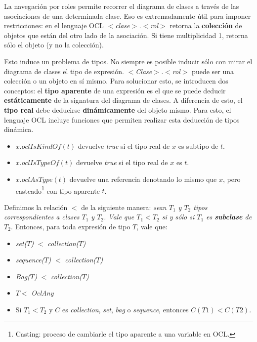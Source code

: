 \documentclass[]{article}
\begin{document}
La navegación por roles permite recorrer el diagrama de clases a través de las asociaciones de una determinada clase. Eso es extremadamente útil para imponer restricciones: en el lenguaje OCL \textit{$<$clase$>$.$<$rol$>$} retorna la \textbf{colección} de objetos que están del otro lado de la asociación. Si tiene multiplicidad 1, retorna sólo el objeto (y no la colección).

Esto induce un problema de tipos. No siempre es posible inducir sólo con mirar el diagrama de clases el tipo de expresión. \textit{$<$Clase$>$.$<$rol$>$} puede ser una colección o un objeto en sí mismo. Para solucionar esto, se introducen dos conceptos: el \textbf{tipo aparente} de una expresión es el que se puede deducir \textbf{estáticamente} de la signatura del diagrama de clases. A diferencia de esto, el \textbf{tipo real} debe deducirse \textbf{dinámicamente} del objeto mismo.  Para esto, el lenguaje OCL incluye funciones que permiten realizar esta deducción de tipos dinámica.
\begin{itemize}
	\item $x.oclIsKindOf(t)$ devuelve \textit{true} si el tipo real de $x$ es subtipo de $t$.
	\item $x.oclIsTypeOf(t)$ devuelve \textit{true} si el tipo real de $x$ es $t$.
	\item $x.oclAsType(t)$ devuelve una referencia denotando lo mismo que $x$, pero casteado\footnote{Casting: proceso de cambiarle el tipo aparente a una variable en OCL.} con tipo aparente $t$.
\end{itemize}

Definimos la relación $<$ de la siguiente manera: \textit{sean $T_1$ y $T_2$ tipos correspondientes a clases $T_1$ y $T_2$. Vale que $T_1<T_2$ si y sólo si $T_1$ es \textbf{subclase} de $T_2$}. Entonces, para toda expresión de tipo $T$, vale que:
\begin{itemize}
	\item \textit{set($T$)} $<$ \textit{collection($T$)}
	\item \textit{sequence($T$)} $<$ \textit{collection($T$)}
	\item \textit{Bag($T$)} $<$ \textit{collection($T$)}
	\item $T <$ \textit{OclAny}
	\item Si $T_1 < T_2$ y $C$ es \textit{collection}, \textit{set}, \textit{bag} o \textit{sequence}, entonces $C(T1) < C(T2)$. %
\end{itemize}
\end{document}
